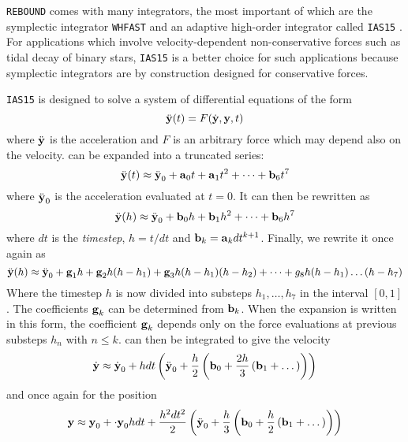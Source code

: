 \documentclass[ twoside,openright,titlepage,numbers=noenddot,headinclude,%
                footinclude=true,cleardoublepage=empty,abstractoff, %
                BCOR=5mm,paper=a4,fontsize=11pt,%
                american,%
                ]{scrreprt}
\begin{document}
\texttt{REBOUND} comes with many integrators, the most important of which
are the symplectic integrator \texttt{WHFAST} \citep{Rein2015} and an
adaptive high-order integrator called \texttt{IAS15} \citep{Rein2014}. For
applications which involve velocity-dependent non-conservative forces
such as tidal decay of binary stars, \texttt{IAS15} is a better choice
for such applications because symplectic integrators are by construction
designed for conservative forces. 

\texttt{IAS15} is designed to solve a system of differential equations of the form
\begin{equation}
    \ddot{\boldsymbol{\mathbf{y}}}(t)=F(\dot{\boldsymbol{\mathbf{y}}},\boldsymbol{\mathbf{y}},t)
    \label{eq:diff_eq}
\end{equation}
where $\ddot{\boldsymbol{\mathbf{y}}}$ is the acceleration and $F$ is an arbitrary force
which may depend also on the velocity.  can be expanded
into a truncated series:
\begin{equation}
    \ddot{\boldsymbol{\mathbf{y}}}(t)\approx \ddot{\boldsymbol{\mathbf{y}}}_0 + \boldsymbol{\mathbf{a}}_0t+\boldsymbol{\mathbf{a}}_1t^2
    +\dots+\boldsymbol{\mathbf{b}}_6t^7
\end{equation}
where $\ddot{\boldsymbol{\mathbf{y}}}_0$ is the acceleration evaluated at $t=0$. 
It can then be rewritten as
\begin{equation}
    \ddot{\boldsymbol{\mathbf{y}}}(h)\approx \ddot{\boldsymbol{\mathbf{y}}}_0 + \boldsymbol{\mathbf{b}}_0h+\boldsymbol{\mathbf{b}}_1h^2
    +\dots+\boldsymbol{\mathbf{b}}_6h^7
    \label{eq:diff_eq2}
\end{equation}
where $dt$ is the \emph{timestep}, $h=t/dt$ and $\boldsymbol{\mathbf{b}}_k=\boldsymbol{\mathbf{a}}_kdt^{k+1}$.
Finally, we rewrite it once again as
\begin{equation}
    \ddot{\boldsymbol{\mathbf{y}}}(h)\approx \ddot{\boldsymbol{\mathbf{y}}}_0 + \boldsymbol{\mathbf{g}}_1h+\boldsymbol{\mathbf{g}}_2h
    (h-h_1)+\boldsymbol{\mathbf{g}}_3h(h-h_1)(h-h_2)+\dots+g_8h(h-h_1)\dots(h-h_7)
\end{equation}
Where the timestep $h$ is now divided into substeps $h_1,\dots,h_7$ in the
interval $[0,1]$. The coefficients $\boldsymbol{\mathbf{g}}_k$ can be determined from 
$\boldsymbol{\mathbf{b}}_k$. When the expansion is written in this form, the coefficient 
$\boldsymbol{\mathbf{g}}_k$ depends only on the force evaluations at previous substeps
$h_n$ with $n\leq k$.  can then be integrated to give the velocity
\begin{equation}
    \dot{\boldsymbol{\mathbf{y}}}\approx \dot{\boldsymbol{\mathbf{y}}}_0+hdt\left(\ddot{\boldsymbol{\mathbf{y}}}_0+
    \frac{h}{2} \left(\boldsymbol{\mathbf{b}}_0+ \frac{2h}{3} \left(\boldsymbol{\mathbf{b}}_1+\dots\right)
    \right)\right)
\end{equation}
and once again for the position
\begin{equation}
    \boldsymbol{\mathbf{y}}\approx\boldsymbol{\mathbf{y}}_0+\cdot{\boldsymbol{\mathbf{y}}}_0hdt+ \frac{h^2dt^2}{2} 
    \left(\ddot{\boldsymbol{\mathbf{y}}}_0+
    \frac{h}{3} \left(\boldsymbol{\mathbf{b}}_0+ \frac{h}{2} \left(\boldsymbol{\mathbf{b}}_1+\dots\right)
    \right)\right)
\end{equation}
\end{document}
